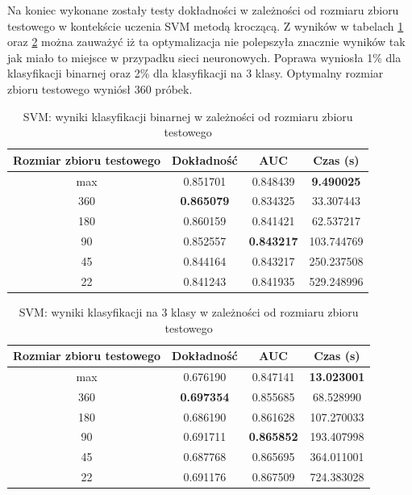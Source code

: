 \documentclass[a4paper, twoside, 11pt, openright]{article}
\begin{document}
Na koniec wykonane zostały testy dokładności w zależności od rozmiaru zbioru testowego w kontekście uczenia SVM metodą kroczącą. Z wyników w tabelach \ref{tab:svm_walk_forward_binary} oraz \ref{tab:svm_walk_forward_discrete} można zauważyć iż ta optymalizacja nie polepszyła znacznie wyników tak jak miało to miejsce w przypadku sieci neuronowych. Poprawa wyniosła 1\% dla klasyfikacji binarnej oraz 2\% dla klasyfikacji na 3 klasy. Optymalny rozmiar zbioru testowego wyniósł 360 próbek.


\begin{table}[H]
    \centering
    \begin{tabular}{|c|c|c|c|}
    \hline
        \textbf{Rozmiar zbioru testowego} & \textbf{Dokładność} & \textbf{AUC} & \textbf{Czas (s)} \\ \hline
max                        &  0.851701 &  0.848439 &   \textbf{9.490025} \\ \hline
360                        &  \textbf{0.865079} &  0.834325 &   33.307443 \\ \hline
180                      &  0.860159 &  0.841421 &   62.537217 \\ \hline
90                         &  0.852557 &  \textbf{0.843217} &  103.744769 \\ \hline
45                       &  0.844164 &  0.843217 &  250.237508 \\ \hline
22                       &  0.841243 &  0.841935 &  529.248996 \\ \hline
    \end{tabular}
    \caption{SVM: wyniki klasyfikacji binarnej w zależności od rozmiaru zbioru testowego}
    \label{tab:svm_walk_forward_binary}
\end{table}


\begin{table}[H]
    \centering
    \begin{tabular}{|c|c|c|c|}
    \hline
        \textbf{Rozmiar zbioru testowego} & \textbf{Dokładność} & \textbf{AUC} & \textbf{Czas (s)} \\ \hline
max                        &  0.676190 &  0.847141 &   \textbf{13.023001} \\ \hline
360                        &  \textbf{0.697354} &  0.855685 &   68.528990 \\ \hline
180                        &  0.686190 &  0.861628 &  107.270033 \\ \hline
90                         &  0.691711 &  \textbf{0.865852} &  193.407998 \\ \hline
45                         &  0.687768 &  0.865695 &  364.011001 \\ \hline
22                          &  0.691176 &  0.867509 &  724.383028 \\ \hline
    \end{tabular}
    \caption{SVM: wyniki klasyfikacji na 3 klasy w zależności od rozmiaru zbioru testowego}
    \label{tab:svm_walk_forward_discrete}
\end{table}
    
\end{document}
